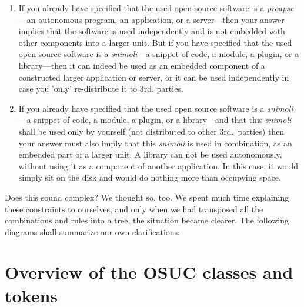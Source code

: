 \begin{enumerate}
  \label{InvalidFinderTokenCombinations}
  \item If you already have specified that the used open source software is a
  \emph{proapse}---an autonomous program, an application, or a server---then
  your answer implies that the software is used independently and is not
  embedded with other components into a larger unit. But if you have specified
  that the used open source software is a \emph{snimoli}---a snippet of
  code, a module, a plugin, or a library---then it can indeed be used as an
  embedded component of a constructed larger application or server, or it can be
  used independently in case you 'only' re-distribute it to 3rd. parties.
  
  \item If you already have specified that the used open source software is a
  \emph{snimoli}---a snippet of code, a module, a plugin, or a library---and
  that this \emph{snimoli} shall be used only by yourself (not distributed to
  other 3rd.\ parties) then your answer must also imply that this \emph{snimoli}
  is used in combination, as an embedded part of a larger unit. A library can
  not be used autonomously, without using it as a component of another
  application. In this case, it would simply sit on the disk and would do
  nothing more than occupying space.

\end{enumerate}

Does this sound complex? We thought so, too. We spent much time explaining these
constraints to ourselves, and only when we had transposed all the combinations
and rules into a tree, the situation became clearer. The following diagrams
shall summarize our own clarifications:

\section{Overview of the OSUC classes and tokens}



